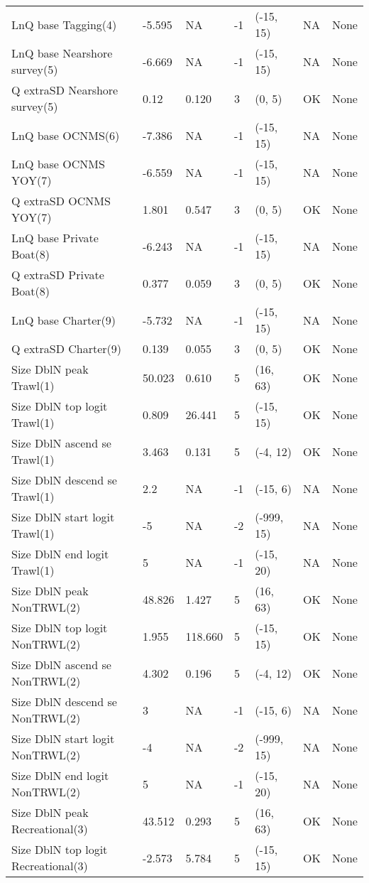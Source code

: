 \documentclass[11pt,
  english,
  letterpaper,
]{article}
\begin{document}
\begin{landscape}
\begin{longtable}[t]{>{\raggedright\arraybackslash}p{7.5cm}lllll>{\raggedright\arraybackslash}p{3.5cm}}
LnQ base Tagging(4) & -5.595 & NA & -1 & (-15, 15) & NA & None\\
LnQ base Nearshore survey(5) & -6.669 & NA & -1 & (-15, 15) & NA & None\\
Q extraSD Nearshore survey(5) & 0.12 & 0.120 & 3 & (0, 5) & OK & None\\
LnQ base OCNMS(6) & -7.386 & NA & -1 & (-15, 15) & NA & None\\
LnQ base OCNMS YOY(7) & -6.559 & NA & -1 & (-15, 15) & NA & None\\
Q extraSD OCNMS YOY(7) & 1.801 & 0.547 & 3 & (0, 5) & OK & None\\
LnQ base Private Boat(8) & -6.243 & NA & -1 & (-15, 15) & NA & None\\
Q extraSD Private Boat(8) & 0.377 & 0.059 & 3 & (0, 5) & OK & None\\
LnQ base Charter(9) & -5.732 & NA & -1 & (-15, 15) & NA & None\\
Q extraSD Charter(9) & 0.139 & 0.055 & 3 & (0, 5) & OK & None\\
Size DblN peak Trawl(1) & 50.023 & 0.610 & 5 & (16, 63) & OK & None\\
Size DblN top logit Trawl(1) & 0.809 & 26.441 & 5 & (-15, 15) & OK & None\\
Size DblN ascend se Trawl(1) & 3.463 & 0.131 & 5 & (-4, 12) & OK & None\\
Size DblN descend se Trawl(1) & 2.2 & NA & -1 & (-15, 6) & NA & None\\
Size DblN start logit Trawl(1) & -5 & NA & -2 & (-999, 15) & NA & None\\
Size DblN end logit Trawl(1) & 5 & NA & -1 & (-15, 20) & NA & None\\
Size DblN peak NonTRWL(2) & 48.826 & 1.427 & 5 & (16, 63) & OK & None\\
Size DblN top logit NonTRWL(2) & 1.955 & 118.660 & 5 & (-15, 15) & OK & None\\
Size DblN ascend se NonTRWL(2) & 4.302 & 0.196 & 5 & (-4, 12) & OK & None\\
Size DblN descend se NonTRWL(2) & 3 & NA & -1 & (-15, 6) & NA & None\\
Size DblN start logit NonTRWL(2) & -4 & NA & -2 & (-999, 15) & NA & None\\
Size DblN end logit NonTRWL(2) & 5 & NA & -1 & (-15, 20) & NA & None\\
Size DblN peak Recreational(3) & 43.512 & 0.293 & 5 & (16, 63) & OK & None\\
Size DblN top logit Recreational(3) & -2.573 & 5.784 & 5 & (-15, 15) & OK & None\\

\end{longtable}
\end{landscape}
\end{document}
